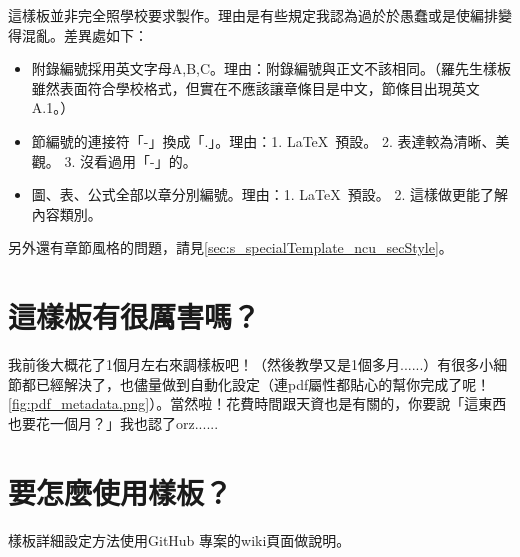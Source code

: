 \documentclass[class=NCU_thesis, crop=false, float=true]{standalone}
\begin{document}
這樣板並非完全照學校要求製作。理由是有些規定我認為過於於愚蠢或是使編排變得混亂。差異處如下：
\begin{itemize}
    \item 附錄編號採用英文字母A,B,C。理由：附錄編號與正文不該相同。（羅先生樣板雖然表面符合學校格式，但實在不應該讓章條目是中文，節條目出現英文A.1。）
    \item 節編號的連接符「-」換成「.」。理由：1. \LaTeX\ 預設。 2. 表達較為清晰、美觀。 3. 沒看過用「-」的。
    \item 圖、表、公式全部以章分別編號。理由：1. \LaTeX\ 預設。 2. 這樣做更能了解內容類別。
\end{itemize}
另外還有章節風格的問題，請見\cref{sec:s_specialTemplate_ncu_secStyle}。

\section{這樣板有很厲害嗎？}
我前後大概花了1個月左右來調樣板吧！（然後教學又是1個多月......）有很多小細節都已經解決了，也儘量做到自動化設定（連pdf屬性都貼心的幫你完成了呢！\cref{fig:pdf_metadata.png}）。當然啦！花費時間跟天資也是有關的，你要說「這東西也要花一個月？」我也認了orz......

\section{要怎麼使用樣板？}
{\color{red}
    樣板詳細設定方法使用GitHub 專案的wiki頁面做說明。
}
\end{document}
